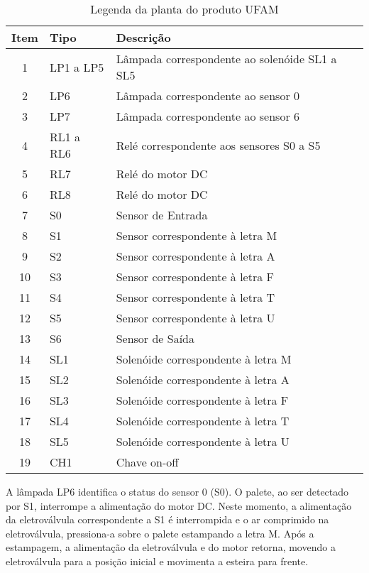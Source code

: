 \begin{table}
 	\centering
 	\caption{Legenda da planta do produto UFAM}
 	\begin{tabular}{ |c | p{2cm}| p{9cm} | } \hline
 		\textbf{ Item} 	   & \textbf{Tipo}	&\textbf{Descrição}  \\ \hline
 		
 		1 & LP1 a LP5 & Lâmpada correspondente ao solenóide SL1 a SL5 \\ \hline
 		2 &LP6 & Lâmpada correspondente ao sensor 0 \\ \hline
 		3 &LP7 & Lâmpada correspondente ao sensor 6 \\ \hline
 		4 &RL1 a RL6 & Relé correspondente aos sensores S0 a S5 \\ \hline
 		5 &RL7 & Relé do motor DC  \\ \hline
 		6 &RL8 & Relé do motor DC  \\ \hline
 		7 &S0 & Sensor de Entrada \\ \hline
 		8 &S1 & Sensor correspondente à letra M \\ \hline
 		9 &S2 & Sensor correspondente à letra A \\ \hline
 		10 &S3 & Sensor correspondente à letra F \\ \hline
 		11 &S4 & Sensor correspondente à letra T \\ \hline
 		12 &S5 & Sensor correspondente à letra U \\ \hline
 		13 &S6 & Sensor de Saída \\ \hline
 		14 &SL1 & Solenóide correspondente à letra M \\ \hline
 		15 &SL2 & Solenóide correspondente à letra A \\ \hline
 		16 &SL3 & Solenóide correspondente à letra F \\ \hline
 		17 &SL4 & Solenóide correspondente à letra T \\ \hline
 		18 &SL5 & Solenóide correspondente à letra U \\ \hline
 		19 & CH1& Chave on-off \\ \hline				 	   			
 	\end{tabular}												
 	\label{T15}\par
\end{table}
 
A lâmpada LP6 identifica o status do sensor 0 (S0). O palete, ao ser detectado por S1, interrompe a alimentação do motor DC. Neste momento, a alimentação da eletroválvula correspondente a S1 é interrompida e o ar comprimido na eletroválvula, pressiona-a sobre o palete estampando a letra M. Após a estampagem, a alimentação da eletroválvula e do motor retorna, movendo a eletroválvula para a posição inicial e movimenta a esteira para frente.


